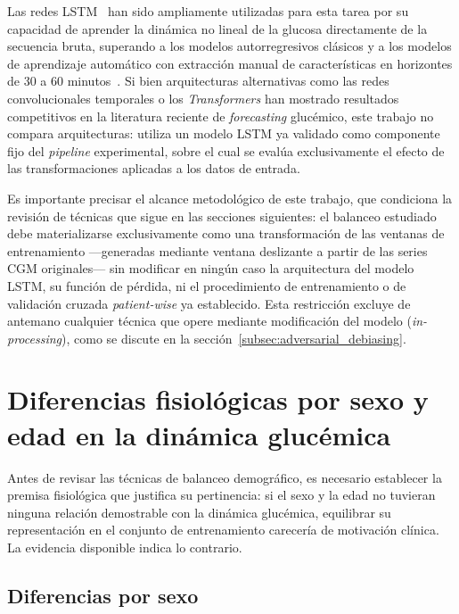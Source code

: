 Las redes LSTM~\cite{hochreiter1997long} han sido ampliamente utilizadas para esta tarea por su capacidad de aprender la dinámica no lineal de la glucosa directamente de la secuencia bruta, superando a los modelos autorregresivos clásicos y a los modelos de aprendizaje automático con extracción manual de características en horizontes de 30 a 60 minutos~\cite{mirshekarian2019using,oviedo2017review}. Si bien arquitecturas alternativas como las redes convolucionales temporales o los \emph{Transformers} han mostrado resultados competitivos en la literatura reciente de \emph{forecasting} glucémico, este trabajo no compara arquitecturas: utiliza un modelo LSTM ya validado como componente fijo del \emph{pipeline} experimental, sobre el cual se evalúa exclusivamente el efecto de las transformaciones aplicadas a los datos de entrada.

Es importante precisar el alcance metodológico de este trabajo, que condiciona la revisión de técnicas que sigue en las secciones siguientes: el balanceo estudiado debe materializarse exclusivamente como una transformación de las ventanas de entrenamiento —generadas mediante ventana deslizante a partir de las series CGM originales— sin modificar en ningún caso la arquitectura del modelo LSTM, su función de pérdida, ni el procedimiento de entrenamiento o de validación cruzada \emph{patient-wise} ya establecido. Esta restricción excluye de antemano cualquier técnica que opere mediante modificación del modelo (\emph{in-processing}), como se discute en la sección~\ref{subsec:adversarial_debiasing}.

\section{Diferencias fisiológicas por sexo y edad en la dinámica glucémica}
\label{sec:diferencias_fisiologicas_sexo_edad}

Antes de revisar las técnicas de balanceo demográfico, es necesario establecer la premisa fisiológica que justifica su pertinencia: si el sexo y la edad no tuvieran ninguna relación demostrable con la dinámica glucémica, equilibrar su representación en el conjunto de entrenamiento carecería de motivación clínica. La evidencia disponible indica lo contrario.

\subsection{Diferencias por sexo}

